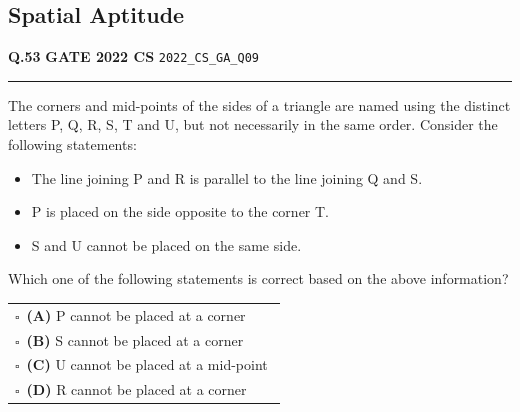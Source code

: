 \documentclass[a4paper,10pt]{article}
\begin{document}
\subsection*{Spatial Aptitude}
\vspace{-4pt}
\noindent
\begin{tcolorbox}[
    blanker,
    sidebyside,
    sidebyside align=top,
    lefthand width=0.55\textwidth,
    top=4pt, bottom=4pt, left=0pt, right=0pt,
    middle=16pt,
    underlay={
        \draw[dashed, black!80, line width=0.8pt, dash pattern=on 4pt off 3pt]
            ([xshift=0.55\textwidth+8pt]frame.north west) --
            ([xshift=0.55\textwidth+8pt]frame.south west);
    }
]
\textbf{Q.53}  \hfill {\footnotesize\textbf{GATE 2022 CS} \quad \tiny\texttt{2022\_CS\_GA\_Q09}}
\vspace{2pt}\hrule height 0.3pt\vspace{4pt}

The corners and mid-points of the sides of a triangle are named using the distinct letters P, Q, R, S, T and U, but not necessarily in the same order. Consider the following statements:
\begin{itemize}[itemsep=0pt,topsep=2pt]
\item The line joining P and R is parallel to the line joining Q and S.
\item P is placed on the side opposite to the corner T.
\item S and U cannot be placed on the same side.
\end{itemize}
Which one of the following statements is correct based on the above information?

\par\vspace{6pt}\noindent
\begin{tabular}{@{}p{0.98\linewidth}@{}}
$\square$\ \textbf{(A)} P cannot be placed at a corner \\
\addlinespace[3pt]
$\square$\ \textbf{(B)} S cannot be placed at a corner \\
\addlinespace[3pt]
$\square$\ \textbf{(C)} U cannot be placed at a mid-point \\
\addlinespace[3pt]
$\square$\ \textbf{(D)} R cannot be placed at a corner
\end{tabular}

\tcblower


\end{tcolorbox}
\end{document}
